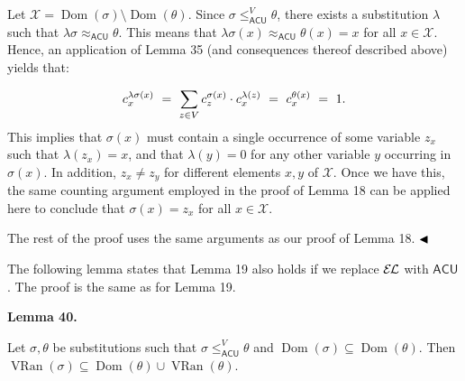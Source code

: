 \documentclass[10pt,a4paper]{amsart}
\begin{document}
Let $\mathcal{X}=\operatorname{Dom}(\sigma)\setminus\operatorname{Dom}(\theta)$. Since $\sigma\leq_{\mathsf{ACU}}^{V}\theta$, there exists a substitution $\lambda$ such that $\lambda\sigma\approx_{\mathsf{ACU}}\theta$. This means that $\lambda\sigma(x)\approx_{\mathsf{ACU}}\theta(x)=x$ for all $x\in\mathcal{X}$. Hence, an application of Lemma 35 (and consequences thereof described above) yields that:\par
    \[c^{\lambda\sigma(x)}_{x}\ =\ \sum\limits_{z\in V}c^{\sigma(x)}_{z}\cdot c^{%
\lambda(z)}_{x}\ =\ c^{\theta(x)}_{x}\ =\ 1.\]    
This implies that $\sigma(x)$ must contain a single occurrence of some variable $z_{x}$ such that $\lambda(z_{x})=x$, and that $\lambda(y)=0$ for any other variable $y$ occurring in $\sigma(x)$. In addition, $z_{x}\neq z_{y}$ for different elements $x,y$ of $\mathcal{X}$. Once we have this, the same counting argument employed in the proof of Lemma 18 can be applied here to conclude that $\sigma(x)=z_{x}$ for all $x\in\mathcal{X}$.\par
 
 
 
The rest of the proof uses the same arguments as our proof of Lemma 18. $\hfill\blacktriangleleft$\par
 
 
 
The following lemma states that Lemma 19 also holds if we replace $\mathcal{E\mkern-1.618muL}$ with $\mathsf{ACU}$. The proof is the same as for Lemma 19.\par
 
 
 
\par\medskip\noindent\textbf{Lemma 40.}\par
 
 
Let $\sigma,\theta$ be substitutions such that $\sigma\leq_{\mathsf{ACU}}^{V}\theta$ and $\operatorname{Dom}(\sigma)\subseteq\operatorname{Dom}(\theta)$. Then $\operatorname{VRan}(\sigma)\subseteq\operatorname{Dom}(\theta)\cup%
\operatorname{VRan}(\theta)$.\par
 
 
 
\end{document}
